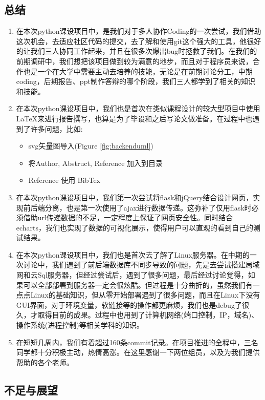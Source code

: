 \documentclass[twoside,11pt]{article}
\begin{document}
\subsection{总结}
\begin{enumerate}
    \item 在本次python课设项目中，是我们对于多人协作Coding的一次尝试，我们借助这次机会，去适应社区代码的提交，去了解和使用git这个强大的工具，他很好的让我们三人协同工作起来，并且在很多次爆出bug时拯救了我们。在我们的前期调研中，我们想把该项目做到较为满意的地步，而且对于程序员来说，合作也是一个在大学中需要主动去培养的技能，无论是在前期讨论分工，中期coding，后期报告、ppt制作答辩的哪个阶段，我们三人都学到了相关的知识和技能。
    \item 在本次python课设项目中，我们也是首次在类似课程设计的较大型项目中使用\LaTeX{}来进行报告撰写，也算是为了毕设和之后写论文做准备。在过程中也遇到了许多问题，比如:
          \begin{itemize}
              \item svg矢量图导入\cite{latexsvg}(Figure \ref{fig:backenduml})
              \item 将Author, Abstruct, Reference 加入到目录
              \item Reference 使用 BibTex
          \end{itemize}
    \item 在本次python课设项目中，我们第一次尝试将flask和jQuery结合设计网页，实现前后端分离，也是第一次使用了ajax进行数据传递\cite{ajax}。这弥补了仅用flask时必须借助url传递数据的不足，一定程度上保证了网页安全性。同时结合echarts，我们也实现了数据的可视化展示，使得用户可以直观的看到自己的测试结果。
    \item 在本次python课设项目中，我们也是首次去了解了Linux服务器。在中期的一次讨论中，我们遇到了前后端数据库不同步导致的问题，先是去尝试搭建局域网和云Sql服务器，但经过尝试后，遇到了很多问题，最后经过讨论觉得，如果可以全部部署到服务器一定会很炫酷。但过程是十分曲折的，虽然我们有一点点Linux的基础知识，但从零开始部署遇到了很多问题，而且在Linux下没有GUI界面，对于环境变量，软链接等的操作都更麻烦，我们也是debug了很久，才取得目前的成果。过程中也用到了计算机网络(端口控制，IP，域名)、操作系统(进程控制)等相关学科的知识。
    \item 在短短几周内，我们有着超过160条commit记录。在项目推进的全程中，三名同学都十分积极主动，热情高涨。在这里感谢一下两位组员，以及为我们提供帮助的各个老师。
\end{enumerate}
\subsection{不足与展望}
\end{document}
